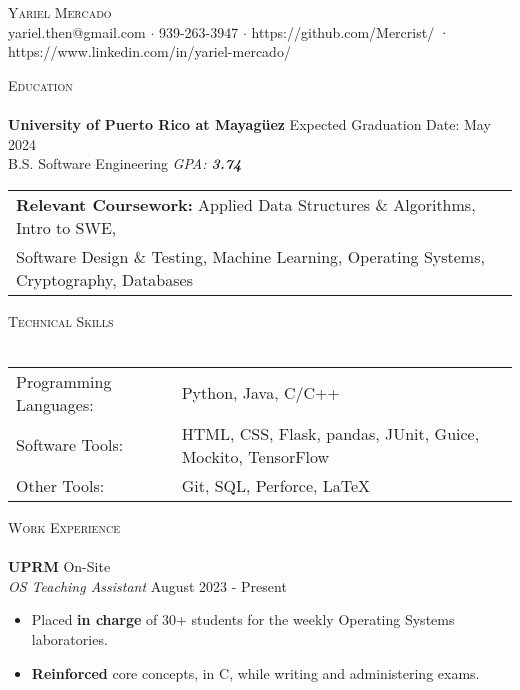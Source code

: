 \documentclass[a4paper]{article}
\newcommand{\lineunder} {
    \vspace*{-8pt} \\
    \hspace*{-18pt} \hrulefill \\
}
\newcommand{\header} [1] {
    {\hspace*{-18pt}\vspace*{6pt} \textsc{#1}}
    \vspace*{-6pt} \lineunder
}
\begin{document}
\vspace*{-40pt}

    

\vspace*{-10pt}
\begin{center}
	{\Huge \scshape {Yariel Mercado}}\\
	yariel.then@gmail.com $\cdot$ 939-263-3947 $\cdot$ https://github.com/Mercrist/ · https://www.linkedin.com/in/yariel-mercado/\\
\end{center}

\header{Education}
\textbf{University of Puerto Rico at Mayagüez} \hfill Expected Graduation Date: May 2024\\	
B.S. Software Engineering \textit{GPA: \bf{3.74}} 

\vspace{2mm}
\begin{tabular}{ l l }
	\textbf{Relevant Coursework:} Applied Data Structures \& Algorithms, Intro to SWE, \\ Software Design \& Testing, Machine Learning, Operating Systems, Cryptography, Databases 
\vspace{2mm}
\end{tabular}

\header{Technical Skills}
\begin{tabular}{ l l }
	Programming Languages: & Python, Java, C/C++    \\
	Software Tools: & HTML, CSS, Flask, pandas, JUnit, Guice, Mockito, TensorFlow \\
	Other Tools:   & Git, SQL, Perforce, \LaTeX{} \\
	
\end{tabular}
\vspace{2mm}

\header{Work Experience}
\vspace{-1mm}
\textbf{UPRM} \hfill On-Site\\

\textit{OS Teaching Assistant} \hfill August 2023 - Present \\
\vspace{-2mm}
\begin{itemize} \itemsep -1pt
	\item Placed \textbf{in charge} of 30+ students for the weekly Operating Systems laboratories.
	\item \textbf{Reinforced} core concepts, in C, while writing and administering exams.
\end{itemize}
\vspace{-2mm}
\end{document}
